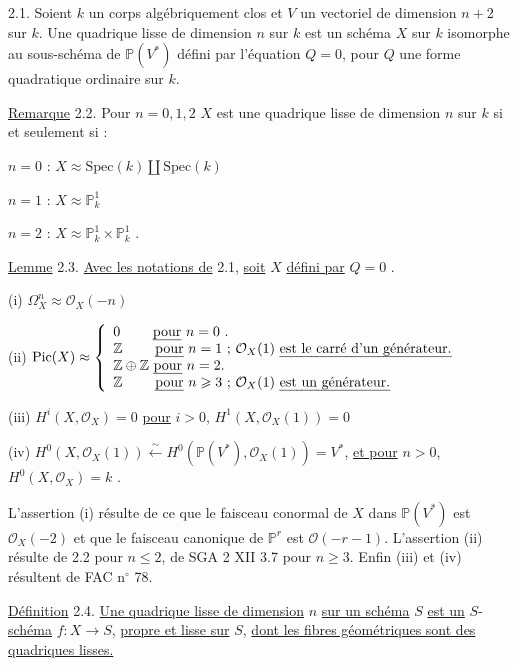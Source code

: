 2.1. Soient $k$ un corps algébriquement clos et $V$ un vectoriel de dimension $n+2$ sur $k$. Une quadrique lisse de dimension $n$ sur $k$ est un schéma $X$ sur $k$ isomorphe au sous-schéma de $\mathbb{P}(V^*)$ défini par l'équation $Q=0$, pour $Q$ une forme quadratique ordinaire sur $k$.

\underline{Remarque} 2.2. Pour $n = 0,1,2$ $X$ est une quadrique lisse de dimension $n$ sur $k$ si et seulement si :

$n = 0$ \qquad : \qquad $X \approx \mathrm{Spec}(k) \amalg \mathrm{Spec}(k)$

$n = 1$ \qquad : \qquad $X \approx \mathbb{P}^1_k$

$n = 2$ \qquad : \qquad $X \approx \mathbb{P}^1_k \times \mathbb{P}^1_k$ .



\underline{Lemme} 2.3. \underline{Avec les notations de} 2.1, \underline{soit} $X$ \underline{défini par} $Q = 0$ .

(i) \qquad $\Omega^n_X \approx \mathcal{O}_X(-n)$

(ii) \quad $\mathrm{Pic}(X) \approx \left\{ \begin{array}{l} \mbox{$0$ \qquad \underline{pour} $n = 0$ .} \\ \mbox{$\mathbb{Z}$ \qquad \underline{pour} $n = 1$ ; $\mathcal{O}_X(1)$ \underline{est le carré d'un générateur.}} \\ \mbox{$\mathbb{Z} \oplus \mathbb{Z}$ \underline{pour} $n =2$.} \\ \mbox{$\mathbb{Z}$ \qquad \underline{pour} $n \geqslant 3$ ; $\mathcal{O}_X(1)$ \underline{est un générateur.}} \end{array} \right.$

(iii) \quad $H^i(X,\mathcal{O}_X) = 0$ \underline{pour} $i > 0$, \qquad $H^1(X,\mathcal{O}_X(1)) = 0$

(iv) \quad $H^0(X,\mathcal{O}_X(1)) \stackrel{\sim}{\longleftarrow} H^0( \mathbb{P}(V^*),\mathcal{O}_X(1)) = V^*$, \underline{et pour} $n > 0$, $H^0(X,\mathcal{O}_X) = k$ .

L'assertion (i) résulte de ce que le faisceau conormal de $X$ dans $\mathbb{P}(V^*)$ est $\mathcal{O}_X(-2)$ et que le faisceau canonique de $\mathbb{P}^r$ est $\mathcal{O}(-r-1)$. L'assertion (ii) résulte de 2.2 pour $n \leqslant 2$, de SGA 2 XII 3.7 pour $n \geqslant 3$. Enfin (iii) et (iv) résultent de FAC n$^\circ$ 78.

\underline{Définition} 2.4. \underline{Une quadrique lisse de dimension} $n$ \underline{sur un schéma} $S$ \underline{est un} $S$-\underline{schéma} $f : X \longrightarrow S$, \underline{propre et lisse sur} $S$, \underline{dont les fibres géométriques sont des quadriques lisses.}

